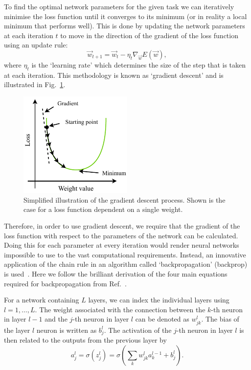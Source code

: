To find the optimal network parameters for the given task we can iteratively minimise the loss
function until it converges to its minimum (or in reality a local minimum that performs well).
This is done by updating the network parameters at each iteration $t$ to move in the direction of
the gradient of the loss function using an update rule:
\begin{equation} %
    \vec{w}_{t+1}=\vec{w}_{t}-\eta_{t}\nabla_{\vec{w}}E(\vec{w}),
\end{equation}
where $\eta_{t}$ is the `learning rate' which determines the size of the step that is taken at
each iteration. This methodology is known as `gradient descent' and is illustrated in
Fig.~\ref{fig:gradient_descent}.

\begin{figure} %
    \includegraphics[width=0.5\textwidth]{diagrams/7-cvn/gradient_descent.pdf}
    \caption[Illustration of the gradient descent process.]
    {Simplified illustration of the gradient descent process. Shown is the case for a loss
        function dependent on a single weight.}
    \label{fig:gradient_descent}
\end{figure}

Therefore, in order to use gradient descent, we require that the gradient of the loss function
with respect to the parameters of the network can be calculated. Doing this for each parameter at
every iteration would render neural networks impossible to use to the vast computational
requirements. Instead, an innovative application of the chain rule in an algorithm called
`backpropagation' (backprop) is used~\cite{werbos1974}. Here we follow the brilliant derivation of
the four main equations required for backpropagation from Ref.~\cite{mehta2019}.

For a network containing $L$ layers, we can index the individual layers using $l=1,\dots,L$. The
weight associated with the connection between the $k$-th neuron in layer $l-1$ and the $j$-th
neuron in layer $l$ can be denoted as $w^{l}_{jk}$. The bias of the layer $l$ neuron is written as
$b^{l}_{j}$. The activation of the $j$-th neuron in layer $l$ is then related to the outputs from
the previous layer by
\begin{equation} %
    a^{l}_{j}=\sigma(z^{l}_{j})=\sigma\left(\sum_{k}w^{l}_{jk}a^{l-1}_{k}+b^{l}_{j}\right).
    \label{eq:feedforward}
\end{equation}

